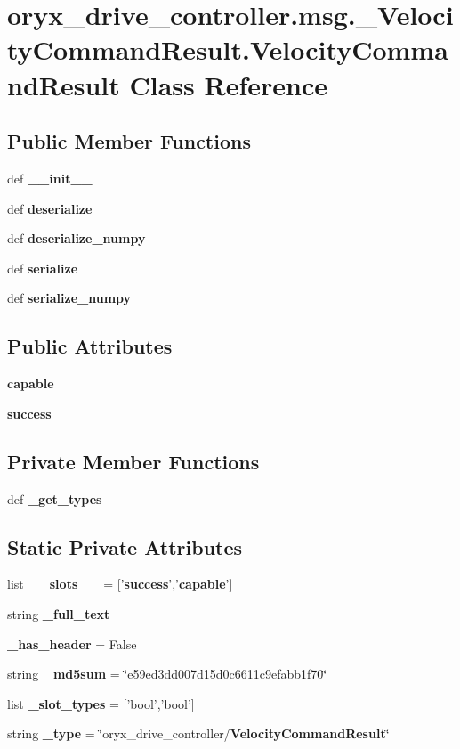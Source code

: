 \section{oryx\-\_\-drive\-\_\-controller.\-msg.\-\_\-\-Velocity\-Command\-Result.\-Velocity\-Command\-Result \-Class \-Reference}
\label{classoryx__drive__controller_1_1msg_1_1__VelocityCommandResult_1_1VelocityCommandResult}
\subsection*{\-Public \-Member \-Functions}
\begin{DoxyCompactItemize}
\item 
def {\bf \-\_\-\-\_\-init\-\_\-\-\_\-}
\item 
def {\bf deserialize}
\item 
def {\bf deserialize\-\_\-numpy}
\item 
def {\bf serialize}
\item 
def {\bf serialize\-\_\-numpy}
\end{DoxyCompactItemize}
\subsection*{\-Public \-Attributes}
\begin{DoxyCompactItemize}
\item 
{\bf capable}
\item 
{\bf success}
\end{DoxyCompactItemize}
\subsection*{\-Private \-Member \-Functions}
\begin{DoxyCompactItemize}
\item 
def {\bf \-\_\-get\-\_\-types}
\end{DoxyCompactItemize}
\subsection*{\-Static \-Private \-Attributes}
\begin{DoxyCompactItemize}
\item 
list {\bf \-\_\-\-\_\-slots\-\_\-\-\_\-} = ['{\bf success}','{\bf capable}']
\item 
string {\bf \-\_\-full\-\_\-text}
\item 
{\bf \-\_\-has\-\_\-header} = \-False
\item 
string {\bf \-\_\-md5sum} = \char`\"{}e59ed3dd007d15d0c6611c9efabb1f70\char`\"{}
\item 
list {\bf \-\_\-slot\-\_\-types} = ['bool','bool']
\item 
string {\bf \-\_\-type} = \char`\"{}oryx\-\_\-drive\-\_\-controller/{\bf \-Velocity\-Command\-Result}\char`\"{}
\end{DoxyCompactItemize}


